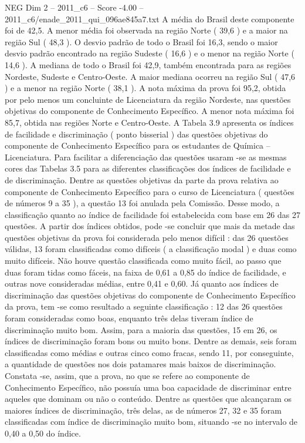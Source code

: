 \begin{textsample}{NEG Dim 2 – 2011\_c6 – Score -4.00 – 2011\_c6/enade\_2011\_qui\_096ae845a7.txt}
A média do Brasil deste componente foi de 42,5.
A menor média foi observada na região Norte ( 39,6 ) e a maior na região Sul ( 48,3 ).
O desvio padrão de todo o Brasil foi 16,3, sendo o maior desvio padrão encontrado na região Sudeste ( 16,6 ) e o menor na região Norte ( 14,6 ).
A mediana de todo o Brasil foi 42,9, também encontrada para as regiões Nordeste, Sudeste e Centro-Oeste.
A maior mediana ocorreu na região Sul ( 47,6 ) e a menor na região Norte ( 38,1 ).
A nota máxima da prova foi 95,2, obtida por pelo menos um concluinte de Licenciatura da região Nordeste, nas questões objetivas do componente de Conhecimento Específico.
A menor nota máxima foi 85,7, obtida nas regiões Norte e Centro-Oeste.
A Tabela 3.9 apresenta os índices de facilidade e discriminação ( ponto bisserial ) das questões objetivas do componente de Conhecimento Específico para os estudantes de Química – Licenciatura.
Para facilitar a diferenciação das questões usaram -se as mesmas cores das Tabelas 3.5 para as diferentes classificações dos índices de facilidade e de discriminação.
Dentre as questões objetivas da parte da prova relativa ao componente de Conhecimento Específico para o curso de Licenciatura ( questões de números 9 a 35 ), a questão 13 foi anulada pela Comissão.
Desse modo, a classificação quanto ao índice de facilidade foi estabelecida com base em 26 das 27 questões.
A partir dos índices obtidos, pode -se concluir que mais da metade das questões objetivas da prova foi considerada pelo menos difícil : das 26 questões válidas, 13 foram classificadas como difíceis ( a classificação modal ) e duas como muito difíceis.
Não houve questão classificada como muito fácil, ao passo que duas foram tidas como fáceis, na faixa de 0,61 a 0,85 do índice de facilidade, e outras nove consideradas médias, entre 0,41 e 0,60.
Já quanto aos índices de discriminação das questões objetivas do componente de Conhecimento Específico da prova, tem -se como resultado a seguinte classificação : 12 das 26 questões foram consideradas como boas, enquanto três delas tiveram índice de discriminação muito bom.
Assim, para a maioria das questões, 15 em 26, os índices de discriminação foram bons ou muito bons.
Dentre as demais, seis foram classificadas como médias e outras cinco como fracas, sendo 11, por conseguinte, a quantidade de questões nos dois patamares mais baixos de discriminação.
Constata -se, assim, que a prova, no que se refere ao componente de Conhecimento Específico, não possuía uma boa capacidade de discriminar entre aqueles que dominam ou não o conteúdo.
Dentre as questões que alcançaram os maiores índices de discriminação, três delas, as de números 27, 32 e 35 foram classificadas com índice de discriminação muito bom, situando -se no intervalo de 0,40 a 0,50 do índice.

\end{textsample}
